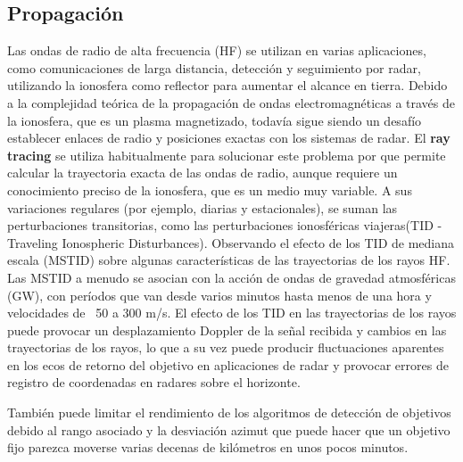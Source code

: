 \documentclass[12pt]{article}
\begin{document}
\subsection{Propagación}
Las ondas de radio de alta frecuencia (HF) se utilizan en varias aplicaciones, como comunicaciones 
de larga distancia, detección y seguimiento por radar, utilizando la ionosfera como reflector para
 aumentar el alcance en tierra. Debido a la complejidad teórica de la propagación de ondas 
 electromagnéticas a través de la ionosfera, que es un plasma magnetizado, todavía sigue siendo 
 un desafío establecer enlaces de radio y posiciones exactas con los sistemas de radar. El \textbf{ray tracing} 
 se utiliza habitualmente para solucionar este problema por que permite calcular la trayectoria exacta 
 de las ondas de radio, aunque requiere un conocimiento preciso de la ionosfera, que es un medio muy 
 variable. A sus variaciones regulares (por ejemplo, diarias y estacionales), se suman las perturbaciones 
 transitorias, como las perturbaciones ionosféricas viajeras(TID - Traveling Ionospheric Disturbances).
 Observando el efecto de los TID de mediana escala (MSTID) sobre algunas características de las trayectorias 
 de los rayos HF. Las MSTID a menudo se asocian con la acción de ondas de gravedad atmosféricas (GW), 
 con períodos que van desde varios minutos hasta menos de una hora y velocidades de ~50 a 300 m/s.
 El efecto de los TID en las trayectorias de los rayos puede provocar un desplazamiento Doppler de 
 la señal recibida y cambios en las trayectorias de los rayos, lo que a su vez puede producir fluctuaciones 
 aparentes en los ecos de retorno del objetivo en aplicaciones de radar y provocar errores de registro de 
 coordenadas en radares sobre el horizonte. \par
 También puede limitar el rendimiento de los algoritmos de detección de objetivos debido al rango asociado y 
 la desviación azimut que puede hacer que un objetivo fijo parezca moverse varias decenas de kilómetros en unos 
 pocos minutos.
 
\end{document}
